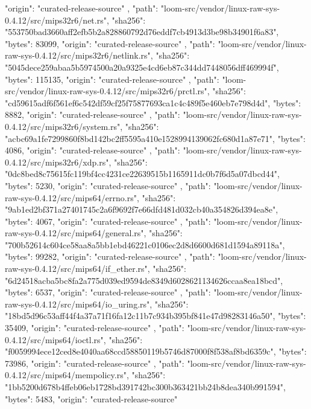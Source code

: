 {{      "origin": "curated-release-source"
    },
    {
      "path": "loom-src/vendor/linux-raw-sys-0.4.12/src/mips32r6/net.rs",
      "sha256": "553750bad3660aff2efb5b2a828860792d76eddf7cb4913d3be98b34901f6a83",
      "bytes": 83099,
      "origin": "curated-release-source"
    },
    {
      "path": "loom-src/vendor/linux-raw-sys-0.4.12/src/mips32r6/netlink.rs",
      "sha256": "5045dece259abaa5b5974500a20a9325e4cd6eb87c344dd7448056dff469994f",
      "bytes": 115135,
      "origin": "curated-release-source"
    },
    {
      "path": "loom-src/vendor/linux-raw-sys-0.4.12/src/mips32r6/prctl.rs",
      "sha256": "cd59615adf6f561ef6c542df59cf25f75877693ca1c4c489f5e460eb7e798d4d",
      "bytes": 8882,
      "origin": "curated-release-source"
    },
    {
      "path": "loom-src/vendor/linux-raw-sys-0.4.12/src/mips32r6/system.rs",
      "sha256": "acbc69a1fe7299860f8bd142bc2ff5595a410e1528994139062fc680d1a87e71",
      "bytes": 4086,
      "origin": "curated-release-source"
    },
    {
      "path": "loom-src/vendor/linux-raw-sys-0.4.12/src/mips32r6/xdp.rs",
      "sha256": "0dc8bed8c75615fc119bf4cc4231ce22639515b1165911dc0b7f6d5a07dbcd44",
      "bytes": 5230,
      "origin": "curated-release-source"
    },
    {
      "path": "loom-src/vendor/linux-raw-sys-0.4.12/src/mips64/errno.rs",
      "sha256": "9ab1ed2bf371a27401745c2a6f9692f7e66dfd481d032cb40a354826d394ea8e",
      "bytes": 4067,
      "origin": "curated-release-source"
    },
    {
      "path": "loom-src/vendor/linux-raw-sys-0.4.12/src/mips64/general.rs",
      "sha256": "700b52614c604ce58aa8a5bb1ebd46221c0106ec2d8d6600d681d1594a89118a",
      "bytes": 99282,
      "origin": "curated-release-source"
    },
    {
      "path": "loom-src/vendor/linux-raw-sys-0.4.12/src/mips64/if_ether.rs",
      "sha256": "6d24518acba5bc8fa2a775d039ed9594de8349d6028621134626ccaa8ea18bcd",
      "bytes": 6537,
      "origin": "curated-release-source"
    },
    {
      "path": "loom-src/vendor/linux-raw-sys-0.4.12/src/mips64/io_uring.rs",
      "sha256": "18bd5d96c53aff44f4a37a71f16fa12c11b7c934b395bf841e47d98283146a50",
      "bytes": 35409,
      "origin": "curated-release-source"
    },
    {
      "path": "loom-src/vendor/linux-raw-sys-0.4.12/src/mips64/ioctl.rs",
      "sha256": "f0059994ece12ced8e4040aa68ccd58850119b5746d87000f8f538af8bd6359c",
      "bytes": 73986,
      "origin": "curated-release-source"
    },
    {
      "path": "loom-src/vendor/linux-raw-sys-0.4.12/src/mips64/mempolicy.rs",
      "sha256": "1bb5200d678b4ffeb06eb1728bd391742bc300b363421bb24b8dea340b991594",
      "bytes": 5483,
      "origin": "curated-release-source"
}}
